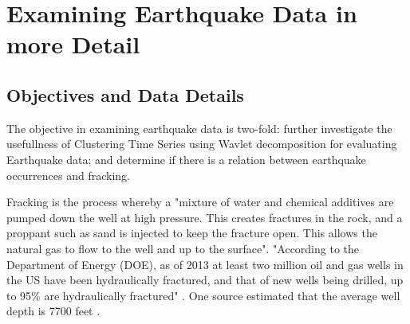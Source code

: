 \documentclass{article}
\begin{document}
\section{Examining Earthquake Data in more Detail}
\subsection{Objectives and Data Details}

The objective in examining earthquake data is two-fold: further investigate  the usefullness of Clustering Time Series using Wavlet decomposition for evaluating Earthquake data; and determine if there is a relation between earthquake occurrences and fracking.


Fracking is the process whereby a "mixture of water and chemical additives are pumped down the well at high pressure. This creates fractures in the rock, and a proppant such as sand is injected to keep the fracture open. This allows the natural gas to flow to the well and up to the surface"\cite{WFUS1}. 
"According to the Department of Energy (DOE), as of 2013 at least two million oil and gas wells in the US have been hydraulically fractured, and that of new wells being drilled, up to 95\% are hydraulically fractured" \cite{WFUS1}.
One source estimated that the average well depth is 7700 feet \cite{HSW1}.
\end{document}
